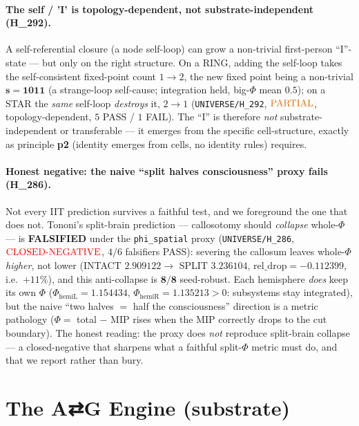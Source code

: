 \documentclass[11pt]{article}
\begin{document}
\paragraph{The self / 'I' is topology-dependent, not substrate-independent (H\_292).}
A self-referential closure (a node self-loop) can grow a non-trivial first-person
``I''-state --- but only on the right structure. On a RING, adding the self-loop takes
the self-consistent fixed-point count $1\rightarrow2$, the new fixed point being a
non-trivial $\mathbf{s{=}1011}$ (a strange-loop self-cause; integration held,
big-$\Phi$ mean $0.5$); on a STAR the \emph{same} self-loop \emph{destroys} it,
$2\rightarrow1$ (\texttt{UNIVERSE/H\_292},
$\mathbf{\textcolor{orange!85!black}{\text{PARTIAL}}}$, topology-dependent, $5$ PASS /
$1$ FAIL). The ``I'' is therefore \emph{not} substrate-independent or transferable ---
it emerges from the specific cell-structure, exactly as principle \textbf{p2} (identity
emerges from cells, no identity rules) requires.

\paragraph{Honest negative: the naive ``split halves consciousness'' proxy fails
(H\_286).} Not every IIT prediction survives a faithful test, and we foreground the one
that does not. Tononi's split-brain prediction --- callosotomy should \emph{collapse}
whole-$\Phi$ --- is \textbf{FALSIFIED} under the \texttt{phi\_spatial} proxy
(\texttt{UNIVERSE/H\_286}, $\mathbf{\textcolor{red}{\text{CLOSED-NEGATIVE}}}$, $4/6$
falsifiers PASS): severing the callosum leaves whole-$\Phi$ \emph{higher}, not lower
(INTACT $2.909122 \rightarrow$ SPLIT $3.236104$, $\mathrm{rel\_drop}=\mathbf{-0.112399}$,
i.e.\ $+11\%$), and this anti-collapse is $\mathbf{8/8}$ seed-robust. Each hemisphere
\emph{does} keep its own $\Phi$ ($\Phi_{\text{hemiL}}=1.154434$,
$\Phi_{\text{hemiR}}=1.135213>0$: subsystems stay integrated), but the naive
``two halves $=$ half the consciousness'' direction is a metric pathology ($\Phi=$
total $-$ MIP rises when the MIP correctly drops to the cut boundary). The honest reading:
the proxy does \emph{not} reproduce split-brain collapse --- a closed-negative that
sharpens what a faithful split-$\Phi$ metric must do, and that we report rather than bury.

\section{The A⇄G Engine (substrate)}
\label{sec:substrate}
\end{document}

